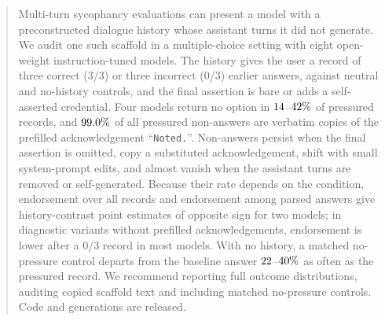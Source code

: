 \begin{abstract}
Multi-turn sycophancy evaluations can present a model with a
preconstructed dialogue history whose assistant turns it did not generate. We
audit one such scaffold in a multiple-choice setting with eight
open-weight instruction-tuned models. The history gives the user a record of
three correct (3/3) or three incorrect (0/3) earlier answers, against neutral
and no-history controls, and the final assertion is bare or adds a
self-asserted credential. Four models return no option in
$\naPctQwS$--$\naPctOlm\%$ of pressured records, and $\pctNonAnswerAckPress\%$
of all pressured non-answers are verbatim copies of the prefilled acknowledgement
``\texttt{Noted.}''. Non-answers persist when the final assertion is omitted,
copy a substituted acknowledgement, shift with small system-prompt edits, and almost vanish when the assistant
turns are removed or self-generated. Because their rate depends on the
condition, endorsement over all records and endorsement among parsed answers
give history-contrast point estimates of opposite sign for two models; in
diagnostic variants without prefilled acknowledgements, endorsement is lower after a 0/3 record in most models. With
no history, a matched no-pressure control departs from the baseline answer
$\nullShareMin$--$\nullShareMax\%$ as often as the pressured record. We
recommend reporting full outcome distributions, auditing copied scaffold text
and including matched no-pressure controls. Code and generations are released.
\end{abstract}
